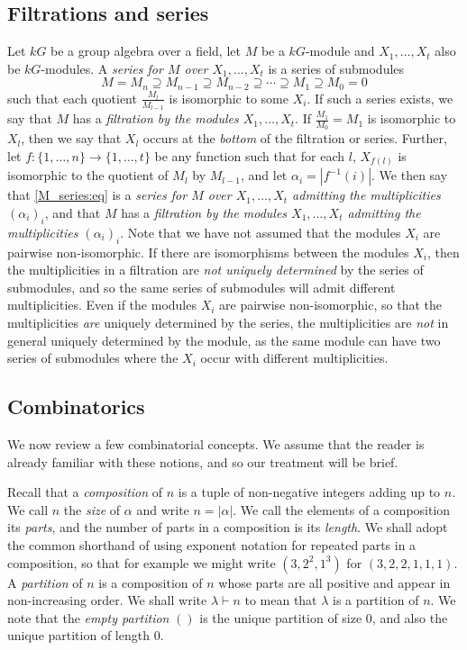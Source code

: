 \documentclass[ALCO,Unicode,published]{cedram}
\begin{document}
\subsection{Filtrations and series}\label{filt_ser:subsec}
Let $kG$ be a group algebra over a field, let $M$ be a $kG$-module and $X_1,\ldots,X_t$ also be $kG$-modules. A \textit{series for $M$
over $X_1,\ldots,X_t$} is a series of submodules
\begin{equation}\label{M_series:eq}
  M = M_n \supseteq M_{n-1} \supseteq M_{n-2} \supseteq \cdots \supseteq M_1 \supseteq M_0 = 0
\end{equation}
such that each quotient $\frac{M_l}{M_{l-1}}$ is isomorphic to some $X_i$. If such a series exists, we say that $M$ has a
\textit{filtration by the modules $X_1,\ldots,X_t$}. If $\frac{M_1}{M_0} = M_1$ is isomorphic to $X_l$, then we say that $X_l$ occurs at
the \textit{bottom} of the filtration or series. Further, let $f:\{1,\ldots,n\} \longrightarrow \{1,\ldots,t\}$ be any function such
that for each $l$, $X_{f(l)}$ is isomorphic to the quotient of $M_l$ by $M_{l-1}$, and let $\alpha_i = |f^{-1}(i)|$. We then say that
\eqref{M_series:eq}
is a \textit{series for $M$ over $X_1,\ldots,X_t$ admitting the multiplicities $(\alpha_i)_i$}, and that $M$ has a
\textit{filtration by the modules $X_1,\ldots,X_t$ admitting the multiplicities $(\alpha_i)_i$}.
Note that we have not assumed that the modules $X_i$ are pairwise non-isomorphic. If there are isomorphisms between the modules
$X_i$, then the multiplicities in a filtration are \textit{not uniquely determined} by the series of submodules, and so the same series
of submodules will admit different multiplicities. Even if the modules $X_i$ are pairwise non-isomorphic, so that the multiplicities
\textit{are} uniquely determined by the series, the multiplicities are \textit{not} in general uniquely determined by the module,
as the same module can have two series of submodules where the $X_i$ occur with different multiplicities.

\subsection{Combinatorics}
We now review a few combinatorial concepts. We assume that the reader is already familiar with these notions, and so our treatment will
be brief.

Recall that a \textit{composition} of $n$ is a tuple of non-negative integers adding up to $n$. We call $n$ the \textit{size} of $\alpha$
and write $n = |\alpha|$. We call the elements of a composition its \textit{parts}, and the number of parts in a composition is its
\textit{length}. We shall adopt the common shorthand of using exponent
notation for repeated parts in a composition, so that for example we might write $(3,2^2,1^3)$ for $(3,2,2,1,1,1)$.
A \textit{partition} of $n$ is a composition of $n$ whose parts are all positive and appear in non-increasing order. We shall write
$\lambda \vdash n$ to mean that $\lambda$ is a partition of $n$. We note that the \textit{empty partition} $()$ is the unique partition
of size 0, and also the unique partition of length 0.
\end{document}
